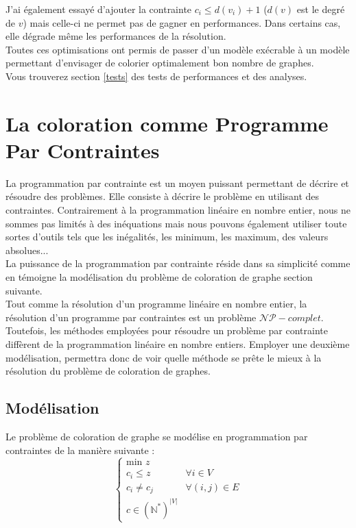 J'ai également essayé d'ajouter la contrainte $c_i\leq d(v_i)+1$ ($d(v)$ est le degré de $v$)
mais celle-ci ne permet pas de gagner
en performances. Dans certains cas, elle dégrade même les performances de la résolution.\\

Toutes ces optimisations ont permis de passer d'un modèle exécrable à un modèle permettant
d'envisager de colorier optimalement bon nombre de graphes.\\
Vous trouverez section \ref{tests} des tests de performances et des analyses. 
 
\section{La coloration comme Programme Par Contraintes}
La programmation par contrainte est un moyen puissant permettant de décrire et résoudre des
problèmes. Elle consiste à décrire le problème en utilisant des contraintes.
Contrairement à la programmation linéaire en nombre entier, nous ne sommes pas
limités à des inéquations mais nous pouvons également utiliser toute sortes d'outils
tels que les inégalités, les minimum, les maximum, des valeurs absolues...\\
La puissance de la programmation par contrainte réside dans sa simplicité
comme en témoigne la modélisation du problème de coloration de graphe section suivante.\\

Tout comme la résolution d'un programme linéaire en nombre entier,
la résolution d'un programme par contraintes est un problème $\mathcal{NP}-complet$.
Toutefois, les méthodes employées pour résoudre un problème par contrainte
diffèrent de la programmation linéaire en nombre entiers.
Employer une deuxième modélisation, permettra donc de voir quelle méthode
se prête le mieux à la résolution du problème de coloration de graphes.

\subsection{Modélisation}
Le problème de coloration de graphe se modélise en programmation par contraintes
de la manière suivante :
\begin{equation}
\label{model-ppc}
\left\{
    \begin{array}{ll}
        \text{min }z & \\
	c_i \leq z & \forall i \in V\\
        c_i \neq c_j & \forall (i,j)\in E\\
	c \in (\mathbb{N}^*)^{|V|}
    \end{array}
\right.
\end{equation}


